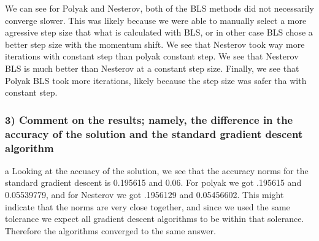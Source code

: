 \documentclass[
  letterpaper,
  DIV=11,
  numbers=noendperiod]{scrartcl}
\begin{document}
We can see for Polyak and Nesterov, both of the BLS methods did not
necessarily converge slower. This was likely because we were able to
manually select a more agressive step size that what is calculated with
BLS, or in other case BLS chose a better step size with the momentum
shift. We see that Nesterov took way more iterations with constant step
than polyak constant step. We see that Nesterov BLS is much better than
Nesterov at a constant step size. Finally, we see that Polyak BLS took
more iterations, likely because the step size was safer tha with
constant step.

\subsubsection{3) Comment on the results; namely, the difference in the
accuracy of the solution and the standard gradient descent
algorithm}\label{comment-on-the-results-namely-the-difference-in-the-accuracy-of-the-solution-and-the-standard-gradient-descent-algorithm}

a Looking at the accuacy of the solution, we see that the accuracy norms
for the standard gradient descent is 0.195615 and 0.06. For polyak we
got .195615 and 0.05539779, and for Nesterov we got .1956129 and
0.05456602. This might indicate that the norms are very close together,
and since we used the same tolerance we expect all gradient descent
algorithms to be within that solerance. Therefore the algorithms
converged to the same answer.
\end{document}
